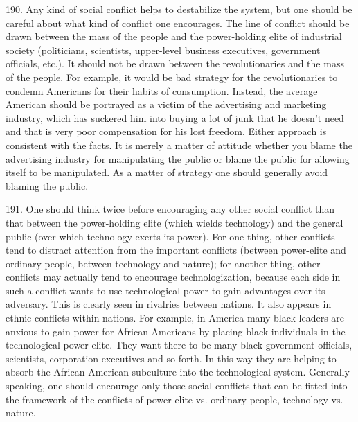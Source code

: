 \documentclass{article}
\begin{document}
190.  Any kind of social conflict helps to destabilize the system, but one should be careful about 
what kind of conflict one encourages.  The line of conflict should be drawn between the mass of 
the  people  and  the  power-holding  elite  of  industrial  society  (politicians,  scientists,  upper-level 
business executives, government officials, etc.).  It should not be drawn between the 
revolutionaries  and  the  mass  of  the  people.   For  example,  it  would  be  bad  strategy  for  the  
revolutionaries  to  condemn  Americans  for  their  habits  of  consumption.   Instead,  the  average  
American should be portrayed as  a victim of the  advertising  and marketing industry, which has 
suckered him into buying a lot of junk that he doesn’t need and that is very poor compensation for 
his  lost  freedom.   Either  approach  is  consistent  with  the  facts.   It  is  merely  a  matter  of  attitude  
whether  you  blame  the  advertising  industry  for  manipulating  the  public  or  blame  the  public  for  
allowing itself to be manipulated.  As a matter of strategy one should generally avoid blaming the 
public. \vspace{\baselineskip}

191.  One should think twice before encouraging any other social conflict than that between the 
power-holding  elite  (which  wields  technology)  and  the  general  public  (over  which  technology  
exerts  its  power).   For  one  thing,  other  conflicts  tend  to  distract  attention  from  the  important  
conflicts (between power-elite and ordinary people, between technology and nature); for another 
thing, other conflicts may actually tend to encourage technologization, because each side in such 
a conflict wants to use technological power to gain advantages over its adversary.  This is clearly 
seen in rivalries between nations.  It also appears in ethnic conflicts within nations.  For example, 
in America many black leaders are anxious to gain power for African Americans by placing black 
individuals  in  the  technological  power-elite.   They  want  there  to  be  many  black  government  
officials, scientists, corporation executives and so forth.  In this way they are helping to absorb the 
African  American  subculture  into  the  technological  system.   Generally  speaking,  one  should  
encourage  only  those  social  conflicts  that  can  be  fitted  into  the  framework  of  the  conflicts  of  
power-elite vs. ordinary people, technology vs. nature. \vspace{\baselineskip}
\end{document}
